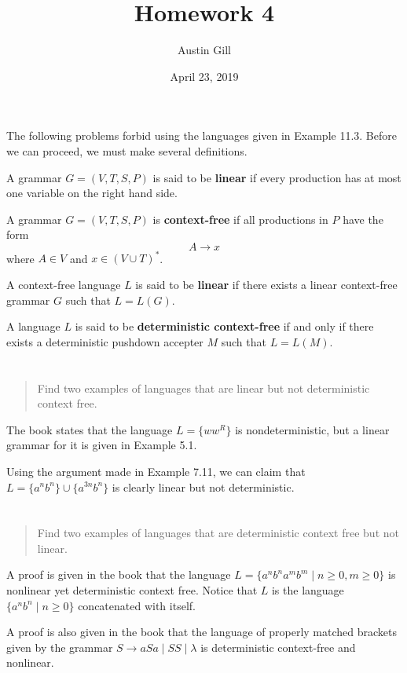 \documentclass{article}
\title{Homework 4}
\author{Austin Gill}
\date{April 23, 2019}
\begin{document}
\maketitle

The following problems forbid using the languages given in Example 11.3. Before we can proceed, we must make several definitions.

\begin{defn}
    A grammar $G = (V, T, S, P)$ is said to be \textbf{linear} if every production has at most one variable on the right hand side.
\end{defn}

\begin{defn}
    A grammar $G = (V, T, S, P)$ is \textbf{context-free} if all productions in $P$ have the form \[A \to x\] where $A \in V$ and $x \in {(V \cup T)}^*$.
\end{defn}

\begin{defn}
    A context-free language $L$ is said to be \textbf{linear} if there exists a linear context-free grammar $G$ such that $L = L(G)$.
\end{defn}

\begin{defn}
    A language $L$ is said to be \textbf{deterministic context-free} if and only if there exists a deterministic pushdown accepter $M$ such that $L = L(M)$.
\end{defn}

\section{}
\begin{quote}
    Find two examples of languages that are linear but not deterministic context free.
\end{quote}

The book states that the language $L = \{ww^R\}$ is nondeterministic, but a linear grammar for it is given in Example 5.1.

Using the argument made in Example 7.11, we can claim that $L = \{a^n b^n \} \cup \{a^{3n} b^n\}$ is clearly linear but not deterministic.

\section{}
\begin{quote}
    Find two examples of languages that are deterministic context free but not linear.
\end{quote}

A proof is given in the book that the language $L = \{ a^n b^n a^m b^m \mid n \geq 0, m \geq 0 \}$ is nonlinear yet deterministic context free. Notice that $L$ is the language $\{a^n b^n \mid n \geq 0 \}$ concatenated with itself.

A proof is also given in the book that the language of properly matched brackets given by the grammar $S \to aSa \mid SS \mid \lambda$ is deterministic context-free and nonlinear.
\end{document}
